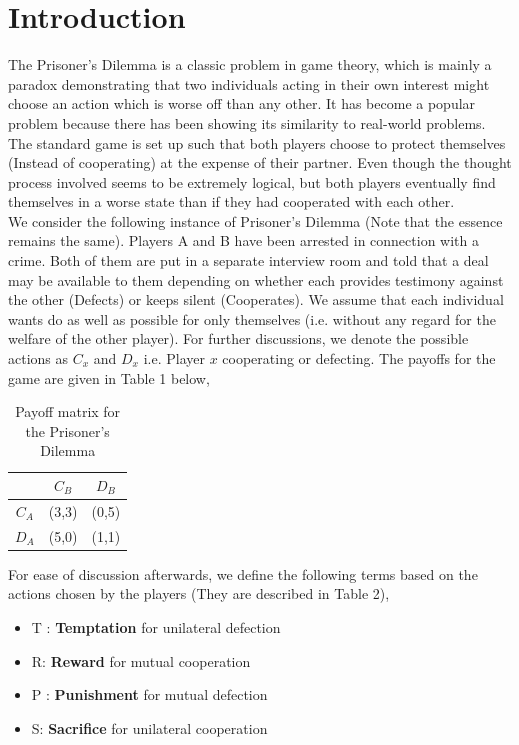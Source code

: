 \documentclass[a4paper]{article}
\begin{document}
	\restoregeometry

	\tableofcontents
	
	\pagebreak	
	
	\section{Introduction}
	
	The Prisoner's Dilemma is a classic problem in game theory, which is mainly a paradox demonstrating that two individuals acting in their own interest might choose an action which is worse off than any other. It has become a popular problem because there has been showing its similarity to real-world problems. The standard game is set up such that both players choose to protect themselves (Instead of cooperating) at the expense of their partner. Even though the thought process involved seems to be extremely logical, but both players eventually find themselves in a worse state than if they had cooperated with each other.\\
	
	We consider the following instance of Prisoner's Dilemma (Note that the essence remains the same). Players A and B have been arrested in connection with a crime. Both of them are put in a separate interview room and told that a deal may be available to them depending on whether each provides testimony against the other (Defects) or keeps silent (Cooperates). We assume that each  individual wants do as well as possible for only themselves (i.e. without any regard for the welfare of the other player). For further discussions, we denote the possible actions as $C_{x}$ and $D_{x}$ i.e. Player $x$ cooperating or defecting. The payoffs for the game are given in Table 1 below,

	\tabcolsep=0.51cm
	\begin{table}[H]
	\centering
	\begin{tabular}{|c|c|c|}
	\hline
					& $C_{B}$           		& $D_{B}$ 					\\ \hline
	$C_{A}$  		& (3,3) 		 			& (0,5)         			\\ \hline
	$D_{A}$			& (5,0)           			& (1,1)            			\\ \hline
	\end{tabular}
	\caption{Payoff matrix for the Prisoner's Dilemma}
	\end{table}
		
	For ease of discussion afterwards, we define the following terms based on the actions chosen by the players (They are described in Table 2),
	\begin{itemize}
		\item T : \textbf{Temptation} for unilateral defection
		\item R: \textbf{Reward} for mutual cooperation
		\item P : \textbf{Punishment} for mutual defection
		\item S: \textbf{Sacrifice} for unilateral cooperation	
	\end{itemize}
	
\end{document}
